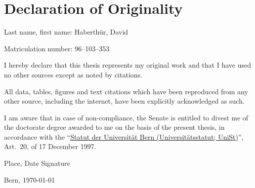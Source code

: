\chapter*{Declaration of Originality}
\thispagestyle{empty}

Last name, first name: Haberthür, David\bigskip

\noindent Matriculation number: 96--103--353\bigskip

I hereby declare that this thesis represents my original work and that I have used no other sources except as noted by citations.

All data, tables, figures and text citations which have been reproduced from any other source, including the internet, have been explicitly acknowledged as such.

I am aware that in case of non-compliance, the Senate is entitled to divest me of the doctorate degree awarded to me on the basis of the present thesis, in accordance with the
``\href{http://www.sta.be.ch/belex/d/4/436_111_2.html}{Statut der Universität Bern (Universitätsstatut; UniSt)}'', Art.\ 20, of 17 December 1997.

\vspace{2cm}
\noindent Place, Date \hfill Signature\bigskip\bigskip

\noindent Bern, \today%